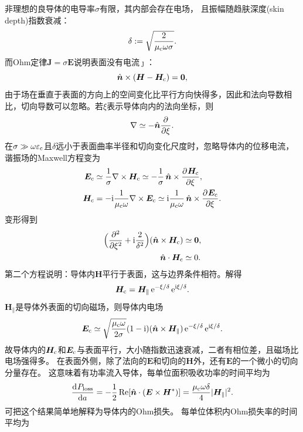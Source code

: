 非理想的良导体的电导率$\sigma$有限，其内部会存在电场，
且振幅随趋肤深度(skin depth)指数衰减：
\begin{equation}
    \delta := \sqrt{\frac2{\mu_\conductor\omega\sigma}}.
\end{equation}
而Ohm定律$\bm J = \sigma\bm E$说明表面没有电流$\bm\jmath$：
\[
    \uvec n \times (\bm H - \bm H_\conductor) = \bm 0,
\]
由于场在垂直于表面的方向上的空间变化比平行方向快得多，因此和法向导数相比，切向导数可以忽略。若$\xi$表示导体向内的法向坐标，则
\[
    \nabla \simeq -{\uvec n}\pp\xi.
\]
在$\sigma \gg \omega\varepsilon_\conductor$且$\delta$远小于表面曲率半径和切向变化尺度时，忽略导体内的位移电流，谐振场的Maxwell方程变为
\begin{align*}
    \bm E_\conductor &\simeq \frac1\sigma\curl\bm H_\conductor \simeq -\frac1\sigma\uvec n \times \pv{\bm H_\conductor}\xi,\\
    \bm H_\conductor &= -\i\frac1{\mu_\conductor\omega}\curl\bm E_\conductor \simeq \i\frac1{\mu_\conductor\omega}\uvec n \times \pv{\bm E_\conductor}\xi.
\end{align*}
变形得到
\begin{align*}
    \Bigp{\pp[2]\xi + \i\frac2{\delta^2}}(\uvec n \times \bm H_\conductor) &\simeq \bm 0,\\
    \uvec n \cdot \bm H_\conductor &\simeq 0.
\end{align*}
第二个方程说明：导体内$\bm H$平行于表面，这与边界条件相符。解得
\begin{equation}
    \bm H_\conductor = \bm H_\parallel\e^{-\xi/\delta}\e^{\i\xi/\delta}.
\end{equation}
$\bm H_\parallel$是导体外表面的切向磁场，则导体内电场
\begin{equation}
    \bm E_\conductor \simeq \sqrt{\frac{\mu_\conductor\omega}{2\sigma}}(1 - \i)(\uvec n \times \bm H_\parallel)\e^{-\xi/\delta}\e^{\i\xi/\delta}.
\end{equation}
故导体内的$\bm H_\conductor$和$\bm E_\conductor$与表面平行，大小随指数迅速衰减，二者有相位差，且磁场比电场强得多。
在表面外侧，除了法向的$\bm E$和切向的$\bm H$外，还有$\bm E$的一个微小的切向分量存在。
这意味着有功率流入导体，每单位面积吸收功率的时间平均为
\begin{equation}
    \dv{P_{\mathrm{loss}}}a = -\frac12\Re[\uvec n \cdot (\bm E \times \bm H\conj)] = \frac{\mu_\conductor\omega\delta}4\abs{\bm H_\parallel}^2.
\end{equation}
可把这个结果简单地解释为导体内的Ohm损失。
每单位体积内Ohm损失率的时间平均为
